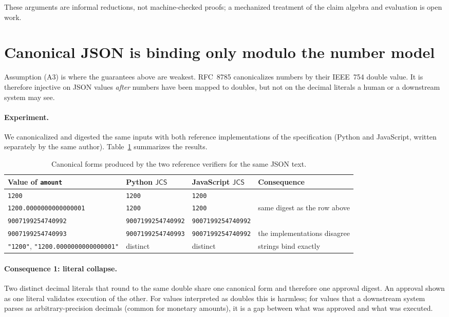 \documentclass[11pt,a4paper]{article}
\theoremstyle{definition}
\theoremstyle{remark}
\newcommand{\code}[1]{\texttt{#1}}
\newcommand{\Canon}{\mathsf{JCS}}
\begin{document}
These arguments are informal reductions, not machine-checked proofs; a mechanized treatment of the claim algebra and evaluation is open work.

\section{Canonical JSON is binding only modulo the number model}\label{sec:canon}

Assumption (A3) is where the guarantees above are weakest. RFC~8785 canonicalizes numbers by their IEEE~754 double value. It is therefore injective on JSON values \emph{after} numbers have been mapped to doubles, but not on the decimal literals a human or a downstream system may see.

\paragraph{Experiment.} We canonicalized and digested the same inputs with both reference implementations of the specification (Python and JavaScript, written separately by the same author). Table~\ref{tab:num} summarizes the results.

\begin{table}[h]
\centering
\small
\begin{tabular}{@{}lllp{3.0cm}@{}}
\toprule
Value of \code{amount} & Python $\Canon$ & JavaScript $\Canon$ & Consequence \\
\midrule
\code{1200} & \code{1200} & \code{1200} & \\
\code{1200.0000000000000001} & \code{1200} & \code{1200} & same digest as the row above \\
\code{9007199254740992} & \code{9007199254740992} & \code{9007199254740992} & \\
\code{9007199254740993} & \code{9007199254740993} & \code{9007199254740992} & the implementations disagree \\
\code{"1200"}, \code{"1200.0000000000000001"} & distinct & distinct & strings bind exactly \\
\bottomrule
\end{tabular}
\caption{Canonical forms produced by the two reference verifiers for the same JSON text.}
\label{tab:num}
\end{table}

\paragraph{Consequence 1: literal collapse.} Two distinct decimal literals that round to the same double share one canonical form and therefore one approval digest. An approval shown as one literal validates execution of the other. For values interpreted as doubles this is harmless; for values that a downstream system parses as arbitrary-precision decimals (common for monetary amounts), it is a gap between what was approved and what was executed.
\end{document}
